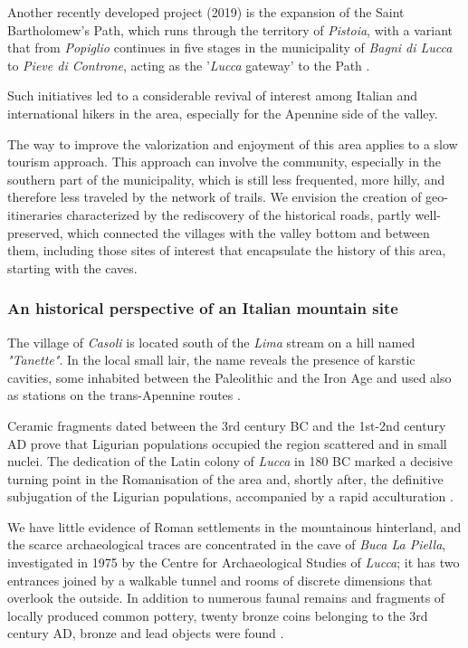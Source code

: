 \documentclass[sustainability,article,submit,pdftex,moreauthors]{Definitions/mdpi}
\begin{document}
Another recently developed project (2019) is the expansion of the Saint Bartholomew's Path, which runs through the territory of \textit{Pistoia}, with a
variant that from \textit{Popiglio} continues in five stages in the municipality of \emph{Bagni di Lucca} to \textit{Pieve di Controne}, acting as the '\emph{Lucca} gateway' to the Path .

Such initiatives led to a considerable revival of interest among Italian and international hikers in the area, especially for the Apennine side of the valley.

The way to improve the valorization and enjoyment of this area applies to a slow tourism approach. This approach can involve the community, especially in the southern part of the municipality, which is still less frequented, more hilly, and therefore less traveled by the network of trails. We envision the creation of geo-itineraries characterized by the rediscovery of the historical roads, partly well-preserved, which connected the villages with the valley bottom and between them, including those sites of interest that encapsulate the history of this area, starting with the caves.

\subsubsection{An historical perspective of an Italian mountain site}

 The village of \emph{Casoli} is located south of the \emph{Lima} stream on a hill named {\em "Tanette"}. In the local small lair, the name reveals the presence of karstic cavities, some inhabited between the Paleolithic and the Iron Age and used also as stations on the trans-Apennine routes \cite{men76, gia96, pal63, zec72a, zec72b}.

Ceramic fragments dated between the 3rd century BC and the 1st-2nd century AD prove that Ligurian populations occupied the region scattered and in small nuclei. The dedication of the Latin colony of \textit{Lucca} in 180 BC marked a decisive turning point in the Romanisation of the area and, shortly after, the definitive subjugation of the Ligurian populations, accompanied by a rapid acculturation \cite{gia96, cia05}.

We have little evidence of Roman settlements in the mountainous hinterland, and the scarce archaeological traces are concentrated in the cave of \textit{Buca La Piella}, investigated in 1975 by the Centre for Archaeological Studies of \emph{Lucca}; it has two entrances joined by a walkable tunnel and rooms of discrete dimensions that overlook the outside. In addition to numerous faunal remains and fragments of locally produced common pottery, twenty bronze coins belonging to the 3rd century AD, bronze and lead objects were found \cite{gia96, men81, cia03}. 
\end{document}
